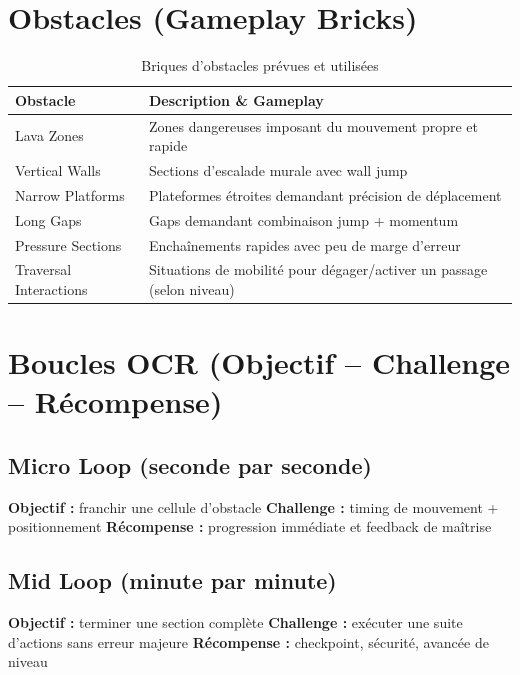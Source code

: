 ﻿\documentclass[12pt,a4paper]{article}
\begin{document}
\section{Obstacles (Gameplay Bricks)}

\begin{table}[h]
\centering
\begin{tabularx}{\textwidth}{|l|X|}
\hline
\textbf{Obstacle} & \textbf{Description \& Gameplay} \\ \hline
Lava Zones & Zones dangereuses imposant du mouvement propre et rapide \\ \hline
Vertical Walls & Sections d'escalade murale avec wall jump \\ \hline
Narrow Platforms & Plateformes étroites demandant précision de déplacement \\ \hline
Long Gaps & Gaps demandant combinaison jump + momentum \\ \hline
Pressure Sections & Enchaînements rapides avec peu de marge d'erreur \\ \hline
Traversal Interactions & Situations de mobilité pour dégager/activer un passage (selon niveau) \\ \hline
\end{tabularx}
\caption{Briques d'obstacles prévues et utilisées}
\end{table}

\section{Boucles OCR (Objectif -- Challenge -- Récompense)}

\subsection{Micro Loop (seconde par seconde)}
\begin{tcolorbox}[colback=lightgray,colframe=black]
\textbf{Objectif :} franchir une cellule d'obstacle\newline
\textbf{Challenge :} timing de mouvement + positionnement\newline
\textbf{Récompense :} progression immédiate et feedback de maîtrise
\end{tcolorbox}

\subsection{Mid Loop (minute par minute)}
\begin{tcolorbox}[colback=lightgray,colframe=black]
\textbf{Objectif :} terminer une section complète\newline
\textbf{Challenge :} exécuter une suite d'actions sans erreur majeure\newline
\textbf{Récompense :} checkpoint, sécurité, avancée de niveau
\end{tcolorbox}
\end{document}
